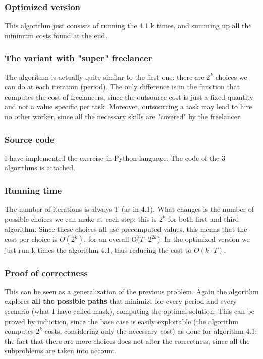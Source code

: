 \subsubsection{Optimized version}
This algorithm just consists of running the 4.1 k times, and summing up all the minimum costs found at the end.

\subsubsection{The variant with "super" freelancer}
The algorithm is actually quite similar to the first one: there are $2^k$ choices we can do at each iteration (period). The only difference is in the function that computes the cost of freelancers, since the outsource cost is just a fixed quantity and not a value specific per task. Moreover, outsourcing a task may lead to hire no other worker, since all the necessary skills are "covered" by the freelancer.

\subsubsection{Source code}
I have implemented the exercise in Python language. The code of the 3 algorithms is attached.

\subsubsection{Running time}
The number of iterations is always T (as in 4.1). What changes is the number of possible choices we can make at each step: this is $2^k$ for both first and third algorithm. Since these choices all use precomputed values, this means that the cost per choice is $O(2^k)$, for an overall O($T \cdot 2^{2k}$). In the optimized version we just run k times the algorithm 4.1, thus reducing the cost to $O(k \cdot T)$.

\subsubsection{Proof of correctness}
This can be seen as a generalization of the previous problem. Again the algorithm explores \textbf{all the possible paths} that minimize for every period and every scenario (what I have called mask), computing the optimal solution. This can be proved by induction, since the base case is easily exploitable (the algorithm computes $2^k$ costs, considering only the necessary cost) as done for algorithm 4.1: the fact that there are more choices does not alter the correctness, since all the subproblems are taken into account. 


